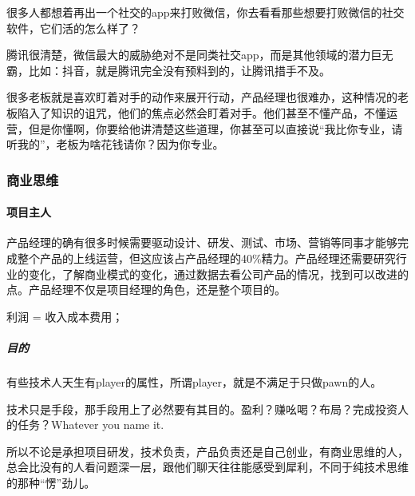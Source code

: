 \documentclass[letterpaper,11pt,english]{sphinxmanual}
\begin{document}
很多人都想着再出一个社交的app来打败微信，你去看看那些想要打败微信的社交软件，它们活的怎么样了？

腾讯很清楚，微信最大的威胁绝对不是同类社交app，而是其他领域的潜力巨无霸，比如：抖音，就是腾讯完全没有预料到的，让腾讯措手不及。

很多老板就是喜欢盯着对手的动作来展开行动，产品经理也很难办，这种情况的老板陷入了知识的诅咒，他们的焦点必然会盯着对手。他们甚至不懂产品，不懂运营，但是你懂啊，你要给他讲清楚这些道理，你甚至可以直接说“我比你专业，请听我的”，老板为啥花钱请你？因为你专业。


\subsubsection{商业思维}
\label{\detokenize{chapter_idea/business:id1}}\label{\detokenize{chapter_idea/business::doc}}

\paragraph{项目主人}
\label{\detokenize{chapter_idea/business:id2}}
产品经理的确有很多时候需要驱动设计、研发、测试、市场、营销等同事才能够完成整个产品的上线运营，但这应该占产品经理的40\%精力。产品经理还需要研究行业的变化，了解商业模式的变化，通过数据去看公司产品的情况，找到可以改进的点。产品经理不仅是项目经理的角色，还是整个项目的。%
\begin{footnote}[331]\sphinxAtStartFootnote
{}
%
\end{footnote}

利润 = 收入\sphinxhyphen{}成本\sphinxhyphen{}费用；


\subparagraph{目的}
\label{\detokenize{chapter_idea/business:id3}}
有些技术人天生有player的属性，所谓player，就是不满足于只做pawn的人。

技术只是手段，那手段用上了必然要有其目的。盈利？赚吆喝？布局？完成投资人的任务？Whatever
you name it.

所以不论是承担项目研发，技术负责，产品负责还是自己创业，有商业思维的人，总会比没有的人看问题深一层，跟他们聊天往往能感受到犀利，不同于纯技术思维的那种“愣”劲儿。
%
\begin{footnote}[332]\sphinxAtStartFootnote
{}
%
\end{footnote}
\end{document}
